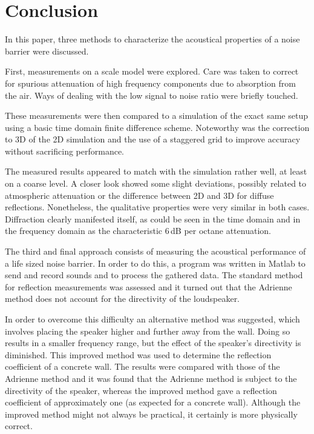 \section{Conclusion}
In this paper, three methods to characterize the acoustical properties of a noise barrier were discussed. 

First, measurements on a scale model were explored. Care was taken to correct for spurious attenuation of high frequency components due to absorption from the air. Ways of dealing with the low signal to noise ratio were briefly touched.

These measurements were then compared to a simulation of the exact same setup using a basic time domain finite difference scheme. Noteworthy was the correction to 3D of the 2D simulation and the use of a staggered grid to improve accuracy without sacrificing performance.

The measured results appeared to match with the simulation rather well, at least on a coarse level. A closer look showed some slight deviations, possibly related to atmospheric attenuation or the difference between 2D and 3D for diffuse reflections. Nonetheless, the qualitative properties were very similar in both cases. Diffraction clearly manifested itself, as could be seen in the time domain and in the frequency domain as the characteristic 6\,dB per octane attenuation.

The third and final approach consists of measuring the acoustical performance of a life sized noise barrier. In order to do this, a program was written in Matlab to send and record sounds and to process the gathered data. The standard method for reflection measurements was assessed and it turned out that the Adrienne method does not account for the directivity of the loudspeaker.

In order to overcome this difficulty an alternative method was suggested, which involves placing the speaker higher and further away from the wall. Doing so results in a smaller frequency range, but the effect of the speaker's directivity is diminished. This improved method was used to determine the reflection coefficient of a concrete wall. The results were compared with those of the Adrienne method and it was found that the Adrienne method is subject to the directivity of the speaker, whereas the improved method gave a reflection coefficient of approximately one (as expected for a concrete wall). Although the improved method might not always be practical, it certainly is more physically correct.


